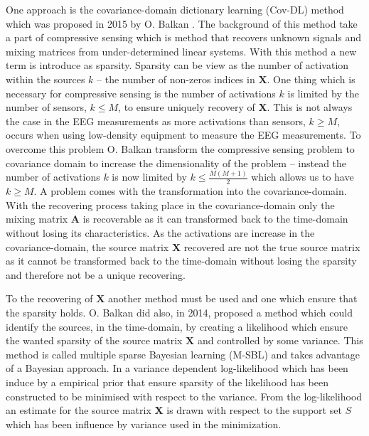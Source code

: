 One approach is the covariance-domain dictionary learning (Cov-DL) method which was proposed in 2015 by O. Balkan \cite{Balkan2015}. 
The background of this method take a part of compressive sensing which is method that recovers unknown signals and mixing matrices from under-determined linear systems. 
With this method a new term is introduce as sparsity. 
Sparsity can be view as the number of activation within the sources $k$ -- the number of non-zeros indices in $\mathbf{X}$.
One thing which is necessary for compressive sensing is the number of activations $k$ is limited by the number of sensors, $k \leq M$, to ensure uniquely recovery of $\mathbf{X}$.
This is not always the case in the EEG measurements as more activations than sensors, $k \geq M$, occurs when using low-density equipment to measure the EEG measurements.
To overcome this problem O. Balkan transform the compressive sensing problem to covariance domain to increase the dimensionality of the problem -- instead the number of activations $k$ is now limited by $k \leq \frac{M(M+1)}{2}$ which allows us to have $k \geq M$.
A problem comes with the transformation into the covariance-domain.
With the recovering process taking place in the covariance-domain only the mixing matrix $\mathbf{A}$ is recoverable as it can transformed back to the time-domain without losing its characteristics. 
As the activations are increase in the covariance-domain, the source matrix $\mathbf{X}$ recovered are not the true source matrix as it cannot be transformed back to the time-domain without losing the sparsity and therefore not be a unique recovering.

To the recovering of $\mathbf{X}$ another method must be used and one which ensure that the sparsity holds.
O. Balkan \cite{Balkan2014} did also, in 2014, proposed a method which could identify the sources, in the time-domain, by creating a likelihood which ensure the wanted sparsity of the source matrix $\mathbf{X}$ and controlled by some variance. This method is called multiple sparse Bayesian learning (M-SBL) and takes advantage of a Bayesian approach. 
In \cite{Balkan2014} a variance dependent log-likelihood which has been induce by a empirical prior that ensure sparsity of the likelihood has been constructed to be minimised with respect to the variance. 
From the log-likelihood an estimate for the source matrix $\mathbf{X}$ is drawn with respect to the support set $S$ which has been influence by variance used in the minimization.





